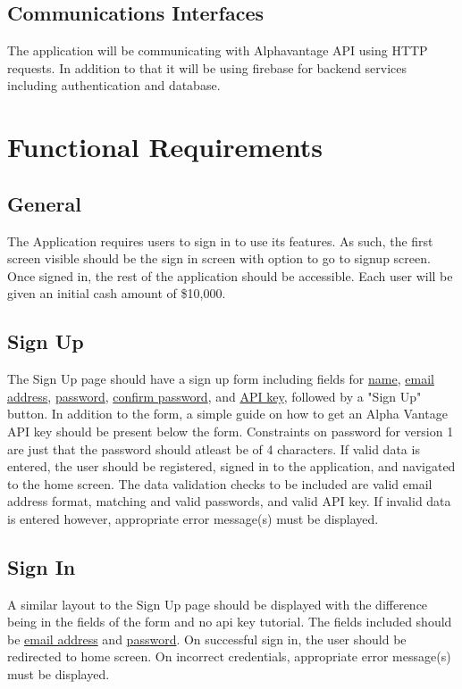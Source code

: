 \documentclass[12 pt, a4paper]{report}
\begin{document}
	\subsection {Communications Interfaces}

	The application will be communicating with Alphavantage API using HTTP requests. In addition to that it will be using firebase for backend services including authentication and database.
	
	\section {Functional Requirements}
	
	\subsection{General}
	The Application requires users to sign in to use its features. As such, the first screen visible should be the sign in screen with option to go to signup screen. Once signed in, the rest of the application should be accessible.
	Each user will be given an initial cash amount of \$10,000.
	\subsection{Sign Up}
	The Sign Up page should have a sign up form including fields for \underline{name}, \underline{email address}, \underline{password}, \underline{confirm password}, and \underline{API key}, followed by a "Sign Up" button. In addition to the form, a simple guide on how to get an Alpha Vantage API key should be present below the form. Constraints on password for version 1 are just that the password should atleast be of 4 characters. If valid data is entered, the user should be registered, signed in to the application, and navigated to the home screen. The data validation checks to be included are valid email address format, matching and valid passwords, and valid API key. If invalid data is entered however, appropriate error message(s) must be displayed.

	
	\subsection{Sign In}
	A similar layout to the Sign Up page should be displayed with the difference being in the fields of the form and no api key tutorial. The fields included should be \underline{email address} and \underline{password}. On successful sign in, the user should be redirected to home screen. On incorrect credentials, appropriate error message(s) must be displayed.
\end{document}
